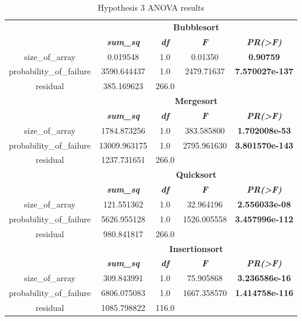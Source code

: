 \begin{table}[H]
    \caption{Hypothesis 3 ANOVA results}
    \begin{center}
    \begin{tabular}{|c|c|c|c|c|}
    \hline
    \multirow{2}{*}{\hfill}&\multicolumn{4}{|c|}{\textbf{Bubblesort}} \\
    \cline{2-5}
    &\textbf{\textit{sum\_sq}} & \textbf{\textit{df}} & \textbf{\textit{F}} & \textbf{\textit{PR(>F)}} \\
    \hline
    size\_of\_array & 0.019548 & 1.0 & 0.01350 & \textbf{0.90759} \\
    \hline
    probability\_of\_failure & 3590.644437 & 1.0 & 2479.71637 & \textbf{7.570027e-137} \\
    \hline
    residual & 385.169623 & 266.0 & &  \\
    \hline
    \multirow{2}{*}{\hfill}&\multicolumn{4}{|c|}{\textbf{Mergesort}} \\
    \cline{2-5}
    &\textbf{\textit{sum\_sq}} & \textbf{\textit{df}} & \textbf{\textit{F}} & \textbf{\textit{PR(>F)}} \\
    \hline
    size\_of\_array & 1784.873256 & 1.0 & 383.585800 & \textbf{1.702008e-53} \\
    \hline
    probability\_of\_failure & 13009.963175 & 1.0 & 2795.961630 & \textbf{3.801570e-143} \\
    \hline
    residual & 1237.731651 & 266.0 & &  \\
    \hline
    \multirow{2}{*}{\hfill}&\multicolumn{4}{|c|}{\textbf{Quicksort}} \\
    \cline{2-5}
    &\textbf{\textit{sum\_sq}} & \textbf{\textit{df}} & \textbf{\textit{F}} & \textbf{\textit{PR(>F)}} \\
    \hline
    size\_of\_array & 121.551362 & 1.0 & 32.964196 & \textbf{2.556033e-08} \\
    \hline
    probability\_of\_failure & 5626.955128 & 1.0 & 1526.005558 & \textbf{3.457996e-112} \\
    \hline
    residual & 980.841817 & 266.0 & &  \\
    \hline
    \multirow{2}{*}{\hfill}&\multicolumn{4}{|c|}{\textbf{Insertionsort}} \\
    \cline{2-5}
    &\textbf{\textit{sum\_sq}} & \textbf{\textit{df}} & \textbf{\textit{F}} & \textbf{\textit{PR(>F)}} \\
    \hline
    size\_of\_array & 309.843991 & 1.0 & 75.905868 & \textbf{3.236586e-16} \\
    \hline
    probability\_of\_failure & 6806.075083 & 1.0 & 1667.358570 & \textbf{1.414758e-116} \\
    \hline
    residual & 1085.798822 & 116.0 & & \\
    \hline
    \end{tabular}
    \label{tab-hypothesis3-testing}
    \end{center}
\end{table}

